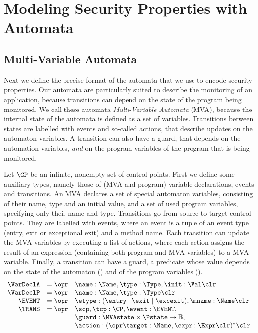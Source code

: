 \section{Modeling Security Properties with Automata}\label{SecMVA}

\subsection{Multi-Variable Automata}
Next we define the precise format of the automata that we use to
encode security properties. Our automata are particularly suited to
describe the monitoring of an application, because transitions can
depend on the state of the program being monitored. We call these
automata \emph{Multi-Variable Automata} (MVA), because the internal
state of the automata is defined as a set of variables. Transitions
between states are labelled with events and so-called actions, that
describe updates on the automaton variables. A transition can also
have a guard, that depends on the automation variables, \emph{and} on
the program variables of the program that is being monitored.

Let \(\CP\) be an infinite, nonempty set of control points.  First we
define some auxiliary types, namely those of (MVA and program)
variable declarations, events and transitions. An MVA declares a set
of special automaton variables, consisting of their name, type and an
initial value, and a set of used program variables, specifying only
their name and type. Transitions go from source to target control
points. They are labelled with events, where an event is a tuple of an
event type (entry, exit or exceptional exit) and a method name. Each
transition can update the MVA variables by executing a list of
actions, where each action assigns the result of an expression
(containing both program and MVA variables) to a MVA
variable. Finally, a transition can have a guard, a predicate whose
value depends on the state of the automaton (\MVAstate) and of the
program variables (\Pstate). 
\[
\begin{array}{rcl}
\VarDeclA & = \opr & \name : \Name, \type : \Type, \init : \Val \clr\\
\VarDeclP & = \opr & \name : \Name, \type : \Type \clr\\
\EVENT & = \opr & \etype : (\entry \mid \exit \mid \excexit), 
                 \mname : \Name \clr\\
\TRANS & = \opr & \scp, \tcp : \CP, \event : \EVENT, \\
& & 
\guard : \MVAstate \times \Pstate \rightarrow \mathbb{B}, \\
&& \action : (\opr \target : \Name, \expr : \Expr \clr)^* \clr
\end{array}
\]


